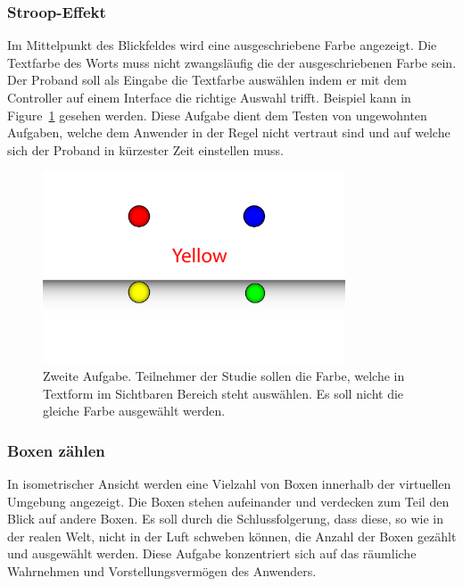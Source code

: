 \subsubsection{Stroop-Effekt} 
Im Mittelpunkt des Blickfeldes wird eine ausgeschriebene Farbe angezeigt. Die Textfarbe des Worts muss nicht zwangsläufig die der ausgeschriebenen Farbe sein. Der Proband soll als Eingabe die Textfarbe auswählen indem er mit dem Controller auf einem Interface die richtige Auswahl trifft. Beispiel kann in Figure~\ref{fig:matching_abstract} gesehen werden. Diese Aufgabe dient dem Testen von ungewohnten Aufgaben, welche dem Anwender in der Regel nicht vertraut sind und auf welche sich der Proband in kürzester Zeit einstellen muss.

\begin{figure}[H]
	\centering
	\includegraphics[width=0.8\textwidth]{./images/matching_abstract.png}
	\caption{Zweite Aufgabe. Teilnehmer der Studie sollen die Farbe, welche in Textform im Sichtbaren Bereich steht auswählen. Es soll nicht die gleiche Farbe ausgewählt werden.}
	\label{fig:matching_abstract}
\end{figure}

\subsubsection{Boxen zählen} 
In isometrischer Ansicht werden eine Vielzahl von Boxen innerhalb der virtuellen Umgebung angezeigt. Die Boxen stehen aufeinander und verdecken zum Teil den Blick auf andere Boxen. Es soll durch die Schlussfolgerung, dass diese, so wie in der realen Welt, nicht in der Luft schweben können, die Anzahl der Boxen gezählt und ausgewählt werden. Diese Aufgabe konzentriert sich auf das räumliche Wahrnehmen und Vorstellungsvermögen des Anwenders.

